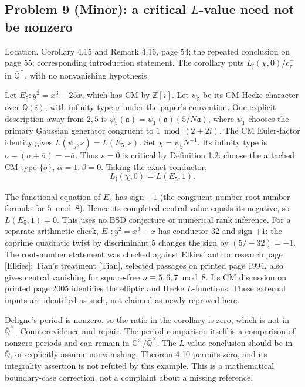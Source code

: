 \documentclass[10pt]{article}
\begin{document}
\subsection*{Problem 9 (Minor): a critical \(L\)-value need not be nonzero}
Location. Corollary 4.15 and Remark 4.16, page 54; the repeated conclusion on page 55; corresponding introduction statement. The corollary puts \(L_{\mathfrak f}(\chi,0)/c^+_\tau\) in \(\overline{\mathbb Q}^\times\), with no nonvanishing hypothesis.\par
Let \(E_5:y^2=x^3-25x\), which has CM by \(\mathbb Z[i]\). Let \(\psi_5\) be its CM Hecke character over \(\mathbb Q(i)\), with infinity type \(\sigma\) under the paper’s convention. One explicit description away from \(2,5\) is \(\psi_5(\mathfrak a)=\psi_1(\mathfrak a)(5/N\mathfrak a)\), where \(\psi_1\) chooses the primary Gaussian generator congruent to \(1\bmod(2+2i)\). The CM Euler-factor identity gives \(L(\psi_5,s)=L(E_5,s)\). Set \(\chi=\psi_5N^{-1}\). Its infinity type is \(\sigma-(\sigma+\overline\sigma)=-\overline\sigma\). Thus \(s=0\) is critical by Definition 1.2: choose the attached CM type \(\{\overline\sigma\}\), \(\alpha=1,\beta=0\). Taking the exact conductor, \[L_{\mathfrak f}(\chi,0)=L(E_5,1).\]\par
The functional equation of \(E_5\) has sign \(-1\) (the congruent-number root-number formula for \(5\bmod8\)). Hence its completed central value equals its negative, so \(L(E_5,1)=0\). This uses no BSD conjecture or numerical rank inference. For a separate arithmetic check, \(E_1:y^2=x^3-x\) has conductor \(32\) and sign \(+1\); the coprime quadratic twist by discriminant \(5\) changes the sign by \((5/-32)=-1\). The root-number statement was checked against Elkies’ author research page [Elkies]; Tian’s treatment [Tian], selected passages on printed page 1994, also gives central vanishing for square-free \(n\equiv5,6,7\bmod8\). Its CM discussion on printed page 2005 identifies the elliptic and Hecke \(L\)-functions. These external inputs are identified as such, not claimed as newly reproved here.\par
Deligne’s period is nonzero, so the ratio in the corollary is zero, which is not in \(\overline{\mathbb Q}^\times\). Counterevidence and repair. The period comparison itself is a comparison of nonzero periods and can remain in \(\mathbb C^\times/\overline{\mathbb Q}^\times\). The \(L\)-value conclusion should be in \(\overline{\mathbb Q}\), or explicitly assume nonvanishing. Theorem 4.10 permits zero, and its integrality assertion is not refuted by this example. This is a mathematical boundary-case correction, not a complaint about a missing reference.\par
\end{document}
